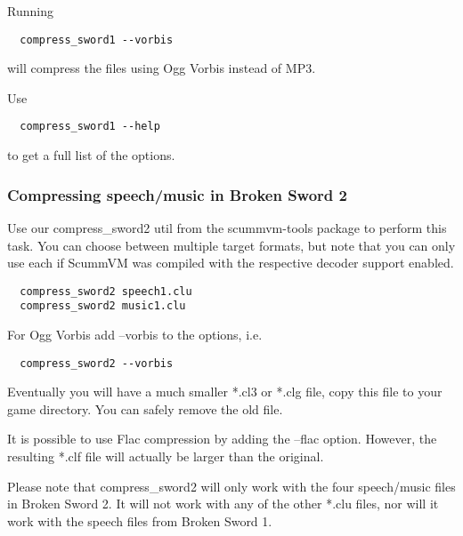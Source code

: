 Running
\begin{verbatim}
  compress_sword1 --vorbis
\end{verbatim}
%
will compress the files using Ogg Vorbis instead of MP3.

Use
\begin{verbatim}
  compress_sword1 --help
\end{verbatim}
%
to get a full list of the options.


\subsubsection{Compressing speech/music in Broken Sword 2}

Use our compress\_sword2 util from the scummvm-tools package to perform this
task. You can choose between multiple target formats, but note  that you can
only use each if ScummVM was compiled with the respective decoder support
enabled.

\begin{verbatim}
  compress_sword2 speech1.clu
  compress_sword2 music1.clu
\end{verbatim}
%
For Ogg Vorbis add --vorbis to the options, i.e.
\begin{verbatim}
  compress_sword2 --vorbis
\end{verbatim}
%
Eventually you will have a much smaller *.cl3 or *.clg file, copy this file to
your game directory. You can safely remove the old file.

It is possible to use Flac compression by adding the --flac option. However,
the resulting *.clf file will actually be larger than the original.

Please note that compress\_sword2 will only work with the four speech/music
files in Broken Sword 2. It will not work with any of the other *.clu files,
nor will it work with the speech files from Broken Sword 1.


